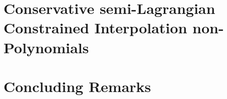 \documentclass[10pt,a4paper]{article}
\begin{document}
\section{Conservative semi-Lagrangian Constrained Interpolation non-Polynomials}
\label{sec:CInonP-CSL}



\section{Concluding Remarks}
\label{sec:Conclusions}


 
\end{document}
